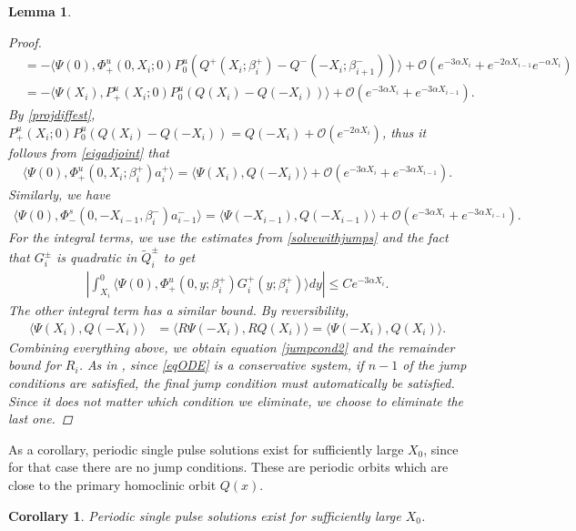 \documentclass[12pt]{elsarticle}
\theoremstyle{plain}
\newtheorem{corollary}[theorem]{Corollary}
\newtheorem{lemma}[theorem]{Lemma}
\theoremstyle{definition}
\theoremstyle{remark}
\numberwithin{theorem}{section}
\numberwithin{equation}{section}
\begin{document}
\begin{lemma}
\begin{proof}
\begin{align*}
&= -\langle \Psi(0), \Phi^u_+(0, X_i; 0) P^u_0 ( Q^+(X_i; \beta_i^+) - Q^-(-X_i; \beta_{i+1}^-)) \rangle + \mathcal{O}( e^{-3 \alpha X_i} + e^{-2\alpha X_{i-1}}e^{-\alpha X_i} ) \\
&= -\langle \Psi(X_i), P^u_+(X_i; 0) P^u_0 ( Q(X_i) - Q(-X_i) ) \rangle + \mathcal{O}( e^{-3 \alpha X_i} + e^{-3\alpha X_{i-1}}).
\end{align*}
By \cref{projdiffest}, $P^u_+(X_i; 0) P^u_0 ( Q(X_i) - Q(-X_i)) = Q(-X_i) + \mathcal{O}(e^{-2\alpha X_i})$, thus it follows from \cref{eigadjoint} that
\begin{align*}
\langle \Psi(0), \Phi^u_+(0, X_i; \beta_i^+) a_i^+ \rangle = 
\langle \Psi(X_i), Q(-X_i) \rangle + \mathcal{O}( e^{-3 \alpha X_i} + e^{-3\alpha X_{i-1}}).
\end{align*}
Similarly, we have
\begin{align*}
\langle \Psi(0), \Phi^s_-(0, -X_{i-1}, \beta_i^-) a_{i-1}^- \rangle = 
\langle \Psi(-X_{i-1}), Q(-X_{i-1}) \rangle + \mathcal{O}( e^{-3 \alpha X_i} + e^{-3\alpha X_{i-1}}).
\end{align*}
For the integral terms, we use the estimates from \cref{solvewithjumps} and the fact that $G_i^\pm$ is quadratic in $\tilde{Q}_i^\pm$ to get
\begin{align*}
\left| \int_{X_i}^0 \langle \Psi(0), \Phi_+^u(0, y; \beta_i^+) G_i^+(y; \beta_i^+) \rangle dy \right| \leq C e^{-3\alpha X_i}.
\end{align*}
The other integral term has a similar bound. By reversibility,
\begin{align*}
\langle \Psi(X_i), Q(-X_i) \rangle 
&= \langle R\Psi(-X_i), R Q(X_i) \rangle 
= \langle \Psi(-X_i), Q(X_i) \rangle.
\end{align*}
Combining everything above, we obtain equation \cref{jumpcond2} and the remainder bound for $R_i$. As in \cite[p. 2093]{SandstedeStrut}, since \cref{eqODE} is a conservative system, if $n-1$ of the jump conditions are satisfied, the final jump condition must automatically be satisfied. Since it does not matter which condition we eliminate, we choose to eliminate the last one. 
\end{proof}
\end{lemma}

As a corollary, periodic single pulse solutions exist for sufficiently large $X_0$, since for that case there are no jump conditions. These are periodic orbits which are close to the primary homoclinic orbit $Q(x)$.

\begin{corollary}\label{corr:1pexists}
Periodic single pulse solutions exist for sufficiently large $X_0$.
\end{corollary}
\end{document}

